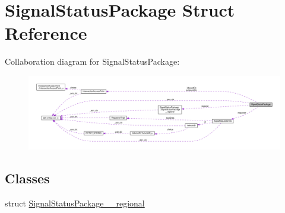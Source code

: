\hypertarget{structSignalStatusPackage}{}\section{Signal\+Status\+Package Struct Reference}
\label{structSignalStatusPackage}


Collaboration diagram for Signal\+Status\+Package\+:\nopagebreak
\begin{figure}[H]
\begin{center}
\leavevmode
\includegraphics[width=350pt]{structSignalStatusPackage__coll__graph}
\end{center}
\end{figure}
\subsection*{Classes}
\begin{DoxyCompactItemize}
\item 
struct \hyperlink{structSignalStatusPackage_1_1SignalStatusPackage____regional}{Signal\+Status\+Package\+\_\+\+\_\+regional}
\end{DoxyCompactItemize}
